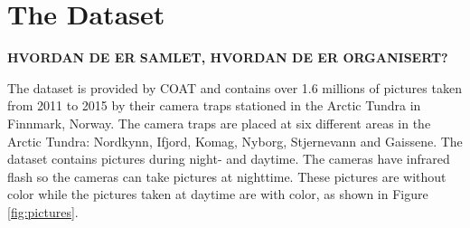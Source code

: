 \documentclass[USenglish]{uit-thesis}
\begin{document}









\chapter{The Dataset} \label{chap:data_set}
\textbf{HVORDAN DE ER SAMLET, HVORDAN DE ER ORGANISERT?}

The dataset is provided by COAT and contains over 1.6 millions of pictures taken from 2011 to 2015 by their camera traps stationed in the Arctic Tundra in Finnmark, Norway. The camera traps are placed at six different areas in the Arctic Tundra: Nordkynn, Ifjord, Komag, Nyborg, Stjernevann and Gaissene.
The dataset contains pictures during night- and daytime. The cameras have infrared flash so the cameras can take pictures at nighttime. These pictures are without color while the pictures taken at daytime are with color, as shown in Figure \ref{fig:pictures}.
\end{document}
